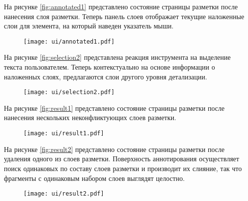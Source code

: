 \documentclass[../main]{subfiles}
\begin{document}
На рисунке \ref{fig:annotated1} представлено состояние страницы разметки после нанесения слоя разметки. Теперь панель слоев отображает текущие наложенные слои для элемента, на который наведен указатель мыши.
\begin{figure}[H]
    \centering
    {\texttt{[image: ui/annotated1.pdf]}}
    \vspace{-\baselineskip}
\end{figure}

На рисунке \ref{fig:selection2} представлена реакция инструмента на выделение текста пользователем. Теперь контекстуально на основе информации о наложенных слоях, предлагаются слои другого уровня детализации.
\begin{figure}[H]
    \centering
    {\texttt{[image: ui/selection2.pdf]}}
    \vspace{-\baselineskip}
\end{figure}

На рисунке \ref{fig:result1} представлено состояние страницы разметки после нанесения нескольких неконфликтующих слоев разметки.
\begin{figure}[H]
    \centering
    {\texttt{[image: ui/result1.pdf]}}
    \vspace{-\baselineskip}
\end{figure}

На рисунке \ref{fig:result2} представлено состояние страницы разметки после удаления одного из слоев разметки. Поверхность аннотирования осуществляет поиск одинаковых по составу слоев разметки и производит их слияние, так что фрагменты с одинаковым набором слоев выглядят целостно.
\begin{figure}[H]
    \centering
    {\texttt{[image: ui/result2.pdf]}}
    \vspace{-\baselineskip}
\end{figure}
\end{document}
